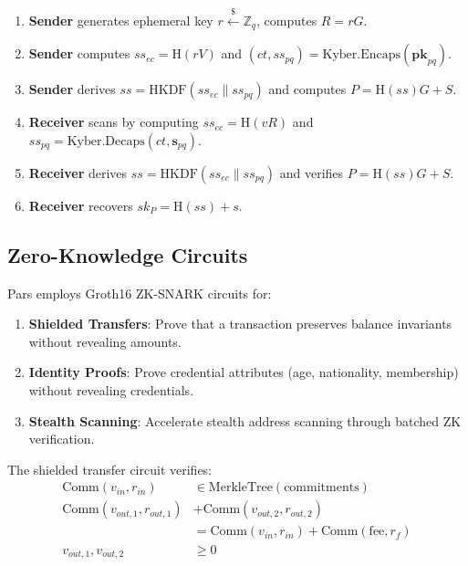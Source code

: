\documentclass[11pt,a4paper,twocolumn]{article}
\begin{document}
\begin{enumerate}[leftmargin=*]
  \item \textbf{Sender} generates ephemeral key $r \xleftarrow{\$} \mathbb{Z}_q$, computes $R = rG$.
  \item \textbf{Sender} computes $ss_{ec} = \text{H}(rV)$ and $(ct, ss_{pq}) = \text{Kyber.Encaps}(\mathbf{pk}_{pq})$.
  \item \textbf{Sender} derives $ss = \text{HKDF}(ss_{ec} \| ss_{pq})$ and computes $P = \text{H}(ss)G + S$.
  \item \textbf{Receiver} scans by computing $ss_{ec} = \text{H}(vR)$ and $ss_{pq} = \text{Kyber.Decaps}(ct, \mathbf{s}_{pq})$.
  \item \textbf{Receiver} derives $ss = \text{HKDF}(ss_{ec} \| ss_{pq})$ and verifies $P = \text{H}(ss)G + S$.
  \item \textbf{Receiver} recovers $sk_P = \text{H}(ss) + s$.
\end{enumerate}

\subsection{Zero-Knowledge Circuits}

Pars employs Groth16 \cite{groth2016size} ZK-SNARK circuits for:

\begin{enumerate}[leftmargin=*]
  \item \textbf{Shielded Transfers}: Prove that a transaction preserves balance invariants without revealing amounts.
  \item \textbf{Identity Proofs}: Prove credential attributes (age, nationality, membership) without revealing credentials.
  \item \textbf{Stealth Scanning}: Accelerate stealth address scanning through batched ZK verification.
\end{enumerate}

The shielded transfer circuit verifies:
\begin{align}
  \text{Comm}(v_{in}, r_{in}) &\in \text{MerkleTree}(\text{commitments}) \label{eq:merkle} \\
  \text{Comm}(v_{out,1}, r_{out,1}) &+ \text{Comm}(v_{out,2}, r_{out,2}) \nonumber \\
  &= \text{Comm}(v_{in}, r_{in}) + \text{Comm}(\text{fee}, r_f) \label{eq:balance} \\
  v_{out,1}, v_{out,2} &\geq 0 \label{eq:range}
\end{align}
\end{document}
